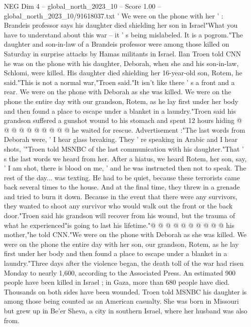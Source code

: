 \begin{textsample}{NEG Dim 4 – global\_north\_2023\_10 – Score 1.00 – global\_north\_2023\_10/91618037.txt}  \label{ex:f4_neg_006}
' We were on the phone with her ' : Brandeis professor says his daughter died shielding her son in Israel"What you have to understand about this war -- it ' s being mislabeled.
It is a pogrom."The daughter and son-in-law of a Brandeis professor were among those killed on Saturday in surprise attacks by Hamas militants in Israel.
Ilan Troen told CNN he was on the phone with his daughter, Deborah, when she and his son-in-law, Schlomi, were killed.
His daughter died shielding her 16-year-old son, Rotem, he said."This is not a normal war,"Troen said."It isn't like there ' s a front and a rear.
We were on the phone with Deborah as she was killed.
We were on the phone the entire day with our grandson, Rotem, as he lay first under her body and then found a place to escape under a blanket in a laundry."Troen said his grandson suffered a gunshot wound to his stomach and spent 12 hours hiding @ @ @ @ @ @ @ @ @ @ he waited for rescue.
Advertisement :"The last words from Deborah were, ' I hear glass breaking.
They ' re speaking in Arabic and I hear shots, '"Troen told MSNBC of the last communication with his daughter."That ' s the last words we heard from her.
After a hiatus, we heard Rotem, her son, say, ' I am shot, there is blood on me, ' and he was instructed then not to speak.
The rest of the day... was texting.
He had to be quiet, because these terrorists came back several times to the house.
And at the final time, they threw in a grenade and tried to burn it down.
Because in the event that there were any survivors, they wanted to shoot any survivor who would walk out the front or the back door."Troen said his grandson will recover from his wound, but the trauma of what he experienced"is going to last his lifetime."@ @ @ @ @ @ @ @ @ @ his mother,"he told CNN."We were on the phone with Deborah as she was killed.
We were on the phone the entire day with her son, our grandson, Rotem, as he lay first under her body and then found a place to escape under a blanket in a laundry."Three days after the violence began, the death toll of the war had risen Monday to nearly 1,600, according to the Associated Press.
An estimated 900 people have been killed in Israel ; in Gaza, more than 680 people have died.
Thousands on both sides have been wounded.
Troen told MSNBC his daughter is among those being counted as an American casualty.
She was born in Missouri but grew up in Be'er Sheva, a city in southern Israel, where her husband was also from.

\end{textsample}
